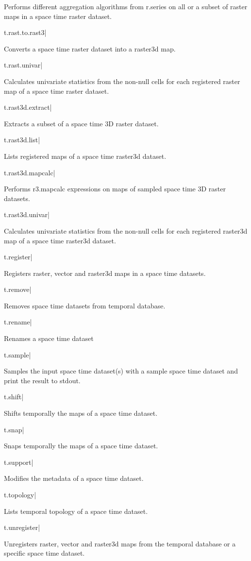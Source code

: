 Performs different aggregation algorithms from r.series on all or
a subset of raster maps in a space time raster dataset.

t.rast.to.rast3|

Converts a space time raster dataset into a raster3d map.

t.rast.univar|

Calculates univariate statistics from the non-null cells for each
registered raster map of a space time raster dataset.

t.rast3d.extract|

Extracts a subset of a space time 3D raster dataset.

t.rast3d.list|

Lists registered maps of a space time raster3d dataset.

t.rast3d.mapcalc|

Performs r3.mapcalc expressions on maps of sampled space time 3D raster
datasets.

t.rast3d.univar|

Calculates univariate statistics from the non-null cells for each
registered raster3d map of a space time raster3d dataset.

t.register|

Registers raster, vector and raster3d maps in a space time datasets.

t.remove|

Removes space time datasets from temporal database.

t.rename|

Renames a space time dataset

t.sample|

Samples the input space time dataset(s) with a sample space time dataset
and print the result to stdout.

t.shift|

Shifts temporally the maps of a space time dataset.

t.snap|

Snaps temporally the maps of a space time dataset.

t.support|

Modifies the metadata of a space time dataset.

t.topology|

Lists temporal topology of a space time dataset.

t.unregister|

Unregisters raster, vector and raster3d maps from the temporal database
or a specific space time dataset.

